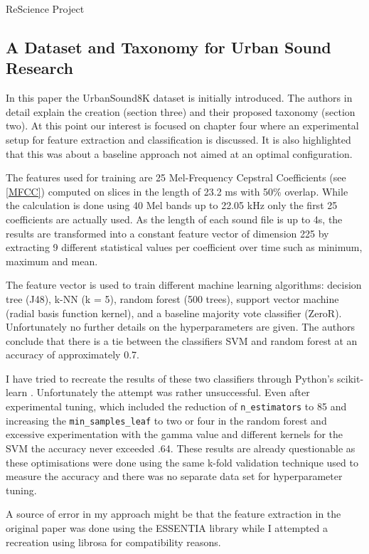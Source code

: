 ReScience Project


\subsection{A Dataset and Taxonomy for Urban Sound Research}

In this paper \cite{Salamon:UrbanSound:ACMMM:14} the UrbanSound8K dataset is initially introduced. The authors in detail explain the creation (section three) and their proposed taxonomy (section two). At this point  our interest is focused on chapter four where an experimental setup for feature extraction and classification is discussed. It is also highlighted that this was about a baseline approach not aimed at an optimal configuration.

The features used for training are 25 Mel-Frequency Cepstral Coefficients (see \ref{MFCC}) computed on slices in the length of 23.2 ms with 50\% overlap. While the calculation is done using 40 Mel bands up to 22.05 kHz only the first 25 coefficients are actually used. As the length of each sound file is up to 4s, the results are transformed into a constant feature vector of dimension 225 by extracting 9 different statistical values per coefficient over time such as minimum, maximum and mean.

The feature vector is used to train different machine learning algorithms: decision tree (J48), k-NN (k = 5), random forest (500 trees), support vector machine (radial basis function kernel), and a baseline majority vote classifier (ZeroR). Unfortunately no further details on the hyperparameters are given. The authors conclude that there is a tie between the classifiers SVM and random forest at an accuracy of approximately 0.7.

I have tried to recreate the results of these two classifiers through Python's scikit-learn \cite{scikit-learn}. Unfortunately the attempt was rather unsuccessful. Even after experimental tuning, which included the reduction of \texttt{n_estimators} to 85 and increasing the \texttt{min_samples_leaf} to two or four in the random forest and excessive experimentation with the gamma value and different kernels for the SVM the accuracy never exceeded .64. These results are already questionable as these optimisations were done using the same k-fold validation technique used to measure the accuracy and there was no separate data set for hyperparameter tuning.
 
A source of error in my approach might be that the feature extraction in the original paper was done using the ESSENTIA library \cite{bogdanov:Essentia:ACMMULTIMEDIA13} while I attempted a recreation using librosa for compatibility reasons. 

